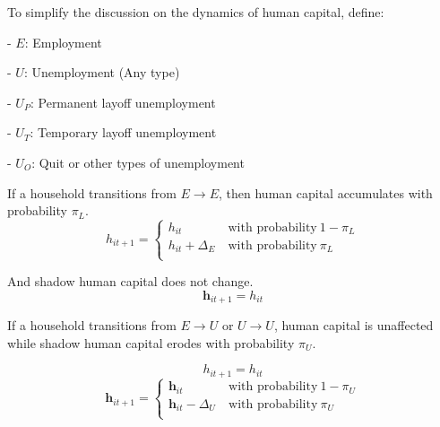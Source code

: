 \vspace{.5cm}

To simplify the discussion on the dynamics of human capital, define:

\vspace{.3cm}

 \indent - $E$: Employment
\vspace{.3cm}


\indent - $U$: Unemployment (Any type)
\vspace{.3cm}

\indent - $U_{P}$: Permanent layoff unemployment
\vspace{.3cm}

\indent - $U_{T}$: Temporary layoff unemployment
\vspace{.3cm}

\indent - $U_{O}$: Quit or other types of unemployment
\vspace{1cm}


If a household transitions from $E \rightarrow E$, then human capital accumulates with probability $\pi_{L}$.
$$ h_{it+1} = \begin{cases}
       h_{it}  & \ \text{with probability} \ 1 - \pi_L \\
       h_{it} + \Delta_{E}  &  \ \text{with probability} \ \pi_{L} \\
    \end{cases} $$ 
\vspace{.2cm}

And shadow human capital does not change. 
$$\mathbf{h}_{it+1} = h_{it}$$

If a household transitions from $E \rightarrow U$ or $U \rightarrow U$, human capital is unaffected while shadow human capital erodes with probability $\pi_{U}$.
\begin{comment}
\begin{align*}
	h_{it+1} &= h_{it} \\
	\mathbf{h}_{it+1} &= \begin{cases}
       \mathbf{h}_{it}  & \ \text{with probability} \ 1 - \pi_U \\
       \mathbf{h}_{it} - \Delta_{U}  &  \ \text{with probability} \ \pi_{U} \\ 
    \end{cases} 
\end{align*}
\end{comment}

$$h_{it+1} = h_{it}$$ 
$$ \mathbf{h}_{it+1} = \begin{cases}
       \mathbf{h}_{it}  & \ \text{with probability} \ 1 - \pi_U \\
       \mathbf{h}_{it} - \Delta_{U}  &  \ \text{with probability} \ \pi_{U} \\ 
    \end{cases} $$ 
\vspace{.2cm}

